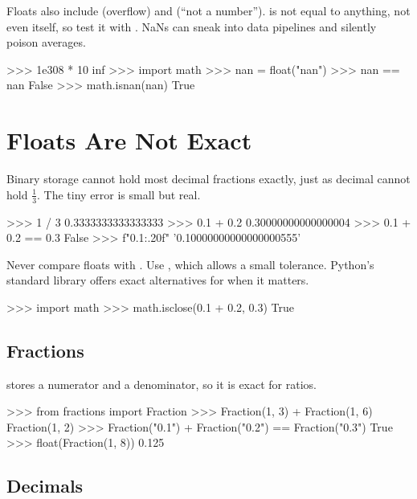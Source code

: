 Floats also include  (overflow) and  (``not a number'').  is not equal to
anything, not even itself, so test it with . NaNs can sneak into data
pipelines and silently poison averages.

\begin{pycode}
>>> 1e308 * 10
inf
>>> import math
>>> nan = float("nan")
>>> nan == nan
False
>>> math.isnan(nan)
True
\end{pycode}

\section{Floats Are Not Exact}

Binary storage cannot hold most decimal fractions exactly, just as decimal cannot hold
$\tfrac13$. The tiny error is small but real.

\begin{pycode}
>>> 1 / 3
0.3333333333333333
>>> 0.1 + 0.2
0.30000000000000004
>>> 0.1 + 0.2 == 0.3
False
>>> f"{0.1:.20f}"
'0.10000000000000000555'
\end{pycode}

\begin{gamerule}
Never compare floats with \code{==}. Use , which allows a small
tolerance. Python's standard library offers exact alternatives for when it matters.
\begin{pycode}
>>> import math
>>> math.isclose(0.1 + 0.2, 0.3)
True
\end{pycode}
\end{gamerule}

\subsection{Fractions}

 stores a numerator and a denominator, so it is exact for ratios.

\begin{pycode}
>>> from fractions import Fraction
>>> Fraction(1, 3) + Fraction(1, 6)
Fraction(1, 2)
>>> Fraction("0.1") + Fraction("0.2") == Fraction("0.3")
True
>>> float(Fraction(1, 8))
0.125
\end{pycode}

\subsection{Decimals}

